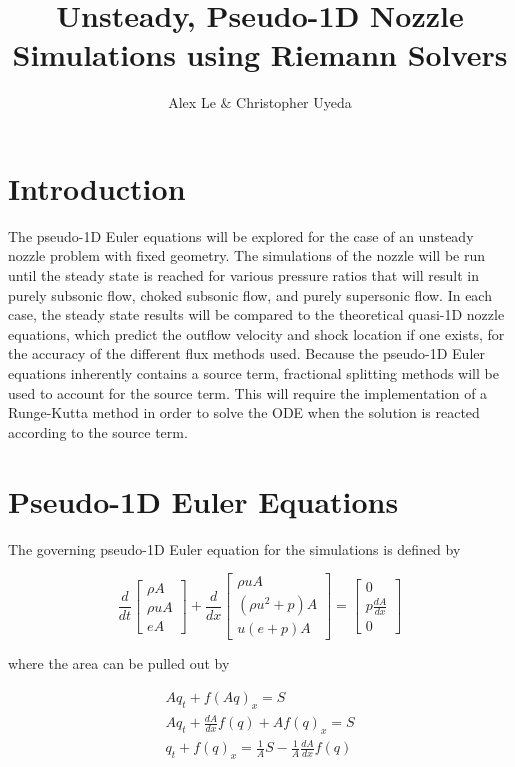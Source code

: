 \documentclass[11pt]{article}%
\title{Unsteady, Pseudo-1D Nozzle Simulations using Riemann Solvers}
\author{Alex Le $\&$ Christopher Uyeda}
\numberwithin{equation}{section}
\begin{document}
\maketitle

\section{Introduction}
The pseudo-1D Euler equations will be explored for the case of an unsteady nozzle problem with fixed geometry. The simulations of the nozzle will be run until the steady state is reached for various pressure ratios that will result in purely subsonic flow, choked subsonic flow, and purely supersonic flow. In each case, the steady state results will be compared to the theoretical quasi-1D nozzle equations, which predict the outflow velocity and shock location if one exists, for the accuracy of the different flux methods used. Because the pseudo-1D Euler equations inherently contains a source term, fractional splitting methods will be used to account for the source term. This will require the implementation of a Runge-Kutta method in order to solve the ODE when the solution is reacted according to the source term.

\section{Pseudo-1D Euler Equations}
The governing pseudo-1D Euler equation for the simulations is defined by

\begin{equation}
\frac{d}{dt} \left[ \begin{array}{c} \rho A \\ \rho u A \\ e A \end{array} \right] + \frac{d}{dx} \left[ \begin{array}{c} \rho u A \\ (\rho u^2 + p) A \\ u(e + p)A \end{array} \right] = \left[ \begin{array}{c} 0 \\ p \frac{dA}{dx} \\ 0 \end{array} \right] \label{psuedoeuler}
\end{equation}

where the area can be pulled out by

\begin{equation*}
\begin{split}
A q_t + f(A q)_x = S \\
A q_t + \frac{dA}{dx} f(q) + A f(q)_x = S \\
q_t + f(q)_x = \frac{1}{A}S - \frac{1}{A} \frac{dA}{dx} f(q) \\
\end{split}
\end{equation*}
\end{document}
